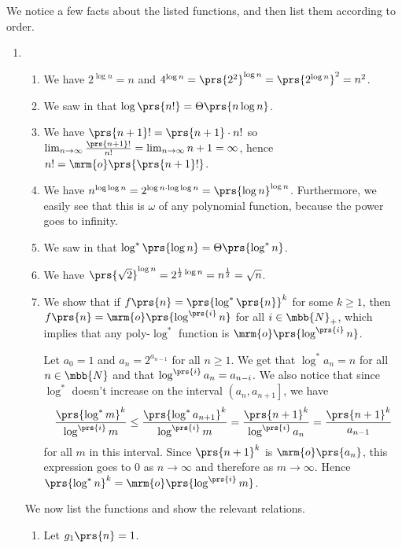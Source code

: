 \documentclass[oneside]{scrbook}
\theoremstyle{definition}
\begin{document}
\begin{problem}
We notice a few facts about the listed functions, and then list them according to order.
\begin{enumerate}[label=\alph*.]
\item
\begin{enumerate}[label=(\arabic*)]
\item We have $2^{\log n} = n$ and $4^{\log n} = \prs{2^2}^{\log n} = \prs{2^{\log n}}^2 = n^2$.
\item We saw in \cite[(3.19)]{intro-to-algorithms-4} that $\log\prs{n!} = \Theta\prs{n \log n}$.
\item We have $\prs{n+1}! = \prs{n+1} \cdot n!$ so $\lim_{n\to\infty} \frac{\prs{n+1}!}{n!} = \lim_{n \to \infty} n+1 = \infty$, hence $n! = \mrm{o}\prs{\prs{n+1}!}$.
\item We have $n^{\log \log n} = 2^{\log n \cdot \log \log n} = \prs{\log n}^{\log n}$. Furthermore, we easily see that this is $\omega$ of any polynomial function, because the power goes to infinity.
\item We saw in  that $\log^*\prs{\log{n}} = \Theta\prs{\log^*{n}}$.
\item We have $\prs{\sqrt{2}}^{\log n} = 2^{\frac{1}{2} \log n} = n^{\frac{1}{2}} = \sqrt{n}$.
\item We show that if $f\prs{n} = \prs{\log^*\prs{n}}^k$ for some $k \geq 1$, then $f\prs{n} = \mrm{o}\prs{\log^{\prs{i}} n}$ for all $i \in \mbb{N}_+$, which implies that any poly-$\log^*$ function is $\mrm{o}\prs{\log^{\prs{i}} n}$.

Let $a_0 = 1$ and $a_n = 2^{a_{n-1}}$ for all $n \geq 1$. We get that $\log^* a_n = n$ for all $n \in \mbb{N}$ and that $\log^{\prs{i}} a_n = a_{n-i}$. We also notice that since $\log^*$ doesn't increase on the interval $\left( a_n, a_{n+1} \right]$, we have \[\frac{\prs{\log^* m}^k}{\log^{\prs{i}} m} \leq \frac{\prs{\log^* a_{n+1}}^k}{\log^{\prs{i}} m} = \frac{\prs{n+1}^k}{\log^{\prs{i}} a_n} = \frac{\prs{n+1}^k}{a_{n-1}}\]
for all $m$ in this interval. Since $\prs{n+1}^k$ is $\mrm{o}\prs{a_n}$, this expression goes to $0$ as $n \to \infty$ and therefore as $m \to \infty$. Hence $\prs{\log^* n}^k = \mrm{o}\prs{\log^{\prs{i}} m}$.
\end{enumerate}

We now list the functions and show the relevant relations.

\begin{enumerate}[label=\arabic*.]
\item Let $g_1\prs{n} = 1$.


\end{enumerate}
\end{enumerate}
\end{problem}
\end{document}

